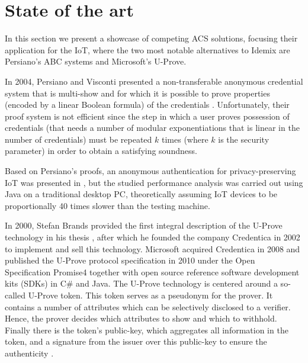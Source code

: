 
\section{State of the art}\label{ch:stateoftheart}


In this section we present a showcase of competing ACS solutions, focusing their application for the IoT, where the two most notable alternatives to Idemix are Persiano's ABC systems and Microsoft's U-Prove.



In 2004, Persiano and Visconti presented a non-transferable anonymous
credential system that is multi-show and for which it is possible to prove
properties (encoded by a linear Boolean formula) of the credentials \cite{Persiano2004}. Unfortunately, their proof system is not efficient since the step in which a user proves possession of credentials (that needs a number of modular exponentiations that is linear in the number of credentials) must be repeated $k$ times (where $k$ is the security parameter) in order to obtain a satisfying soundness.


Based on Persiano's proofs, an anonymous authentication for privacy-preserving IoT was presented in \cite{alcaide2013anonymous}, but the studied performance analysis was carried out using Java on a traditional desktop PC, theoretically assuming IoT devices to be proportionally 40 times slower than the testing machine.




In 2000, Stefan Brands provided the first integral description of the U-Prove
technology in his thesis \cite{uprove}, after which he founded the company Credentica
in 2002 to implement and sell this technology. Microsoft acquired Credentica
in 2008 and published the U-Prove protocol specification \cite{uprove2} in 2010
under the Open Specification Promise4 together with open source reference software
development kits (SDKs) in C\# and Java.
The U-Prove technology is centered around a so-called U-Prove token. This
token serves as a pseudonym for the prover. It contains a number of attributes
which can be selectively disclosed to a verifier. Hence, the prover decides which
attributes to show and which to withhold. Finally there is the token’s public-key, which aggregates all information in the token, and a signature from the issuer
over this public-key to ensure the authenticity \cite{book:947508}.


